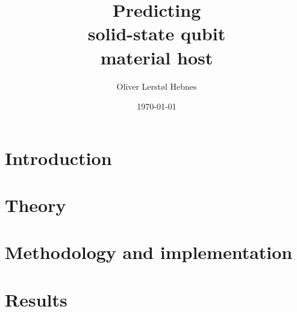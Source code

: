 \documentclass[twoside, english, notitlepage, 12pt]{uiofysmaster}
\author{Oliver Lerstøl Hebnes}
\title{Predicting\\
solid-state qubit\\
material host
}
\date{\today}
\begin{document}
\hypersetup{pageanchor=false}
\frontmatter
    \maketitle



    \setcounter{tocdepth}{2}
    \tableofcontents

\mainmatter
    \part{Introduction}
      

    \part{Theory}
        
        
        

    \part{Methodology and implementation}
        
        

    \part{Results}
      
\end{document}
